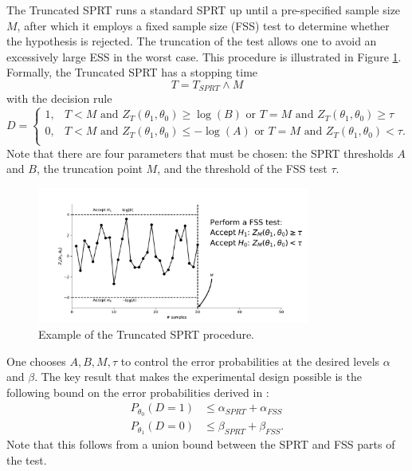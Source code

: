 \documentclass[11pt]{article}
\begin{document}
The Truncated SPRT runs a standard SPRT up until a pre-specified sample size $M$, after which it employs a fixed sample size (FSS) test to determine whether the hypothesis is rejected. The truncation of the test allows one to avoid an excessively large ESS in the worst case. This procedure is illustrated in Figure \ref{fig:trunc_sprt}.  Formally, the Truncated SPRT has a stopping time
\begin{equation}
T = T_{SPRT} \wedge M
\end{equation}
with the decision rule
\begin{equation}
D =
\begin{cases}
1, & T < M \text{ and } Z_T(\theta_1, \theta_0) \geq \log(B) \text{ or } T = M \text{ and } Z_T(\theta_1, \theta_0) \geq \tau \\
0, & T < M \text{ and } Z_T(\theta_1, \theta_0) \leq -\log(A) \text{ or } T = M \text{ and } Z_T(\theta_1, \theta_0) < \tau. \\
\end{cases}
\end{equation}
Note that there are four parameters that must be chosen: the SPRT thresholds $A$ and $B$, the truncation point $M$, and the threshold of the FSS test $\tau$.
\begin{figure}
\centering
\includegraphics[width=0.8\textwidth]{images/truncated_sprt}
\caption{Example of the Truncated SPRT procedure.}
\label{fig:trunc_sprt}
\end{figure}

One chooses $A, B, M, \tau$ to control the error probabilities at the desired levels $\alpha$ and $\beta$. The key result that makes the experimental design possible is the following bound on the error probabilities derived in \citet{tantara1977}:
\begin{equation}\label{eq:design_bound}
\begin{split}
P_{\theta_0}(D = 1) &\leq \alpha_{SPRT} + \alpha_{FSS} \\
P_{\theta_1}(D = 0) &\leq \beta_{SPRT} + \beta_{FSS}.
\end{split}
\end{equation}
Note that this follows from a union bound between the SPRT and FSS parts of the test.
\end{document}
